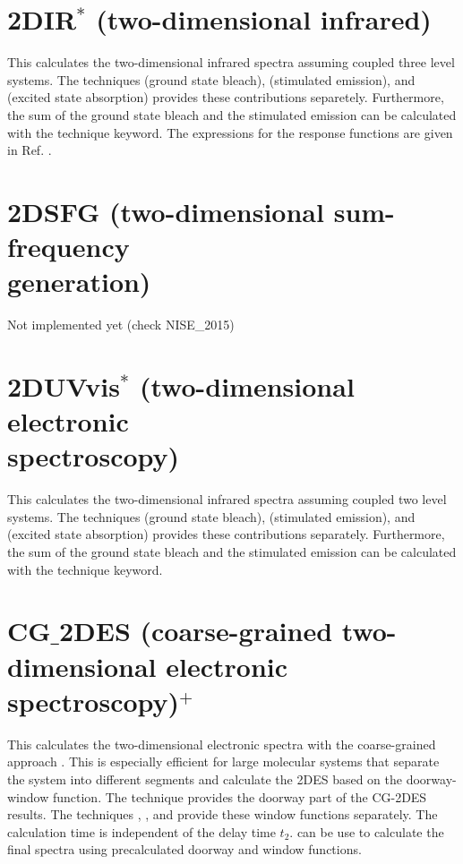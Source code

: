 \section{2DIR$^{*}$ (two-dimensional infrared)}
This calculates the two-dimensional infrared spectra assuming coupled three level
systems. The techniques  (ground state bleach),  (stimulated
emission), and  (excited state absorption) provides these contributions
separetely. Furthermore, the sum of the ground state bleach and the stimulated
emission can be calculated with the  technique keyword.
The expressions for the response functions are given in Ref.
\cite{Jansen.2006.JPCB.110.22910}.

\section{2DSFG (two-dimensional sum-frequency\\ generation)}
Not implemented yet (check NISE\_2015)
 
\section{2DUVvis$^{*}$ (two-dimensional electronic\\ spectroscopy)}
This calculates the two-dimensional infrared spectra assuming coupled two level
systems. The techniques  (ground state bleach),  (stimulated
emission), and  (excited state absorption) provides these contributions
separately. Furthermore, the sum of the ground state bleach and the stimulated
emission can be calculated with the  technique keyword. 

\section{CG$\_$2DES (coarse-grained two-dimensional electronic spectroscopy)$^{+}$}
This calculates the two-dimensional electronic spectra with the coarse-grained
approach \cite{Zhong.2024.J.Chem.TheoryComput..20.6111}. This is especially efficient
for large molecular systems that separate the system into different segments and calculate the 2DES based
on the doorway-window function. The technique  provides the
doorway part of the CG-2DES results. The techniques ,
, and  provide these
window functions separately. The calculation time is independent of the delay time
$t_2$.  can be use to calculate the final spectra using
precalculated doorway and window functions.

